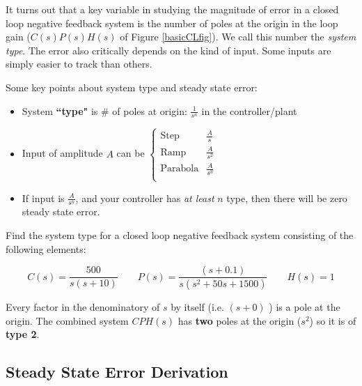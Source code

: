 It turns out that a key variable in studying the magnitude of error in a closed loop negative feedback system 
is the number of poles at the origin in the loop gain ($C(s)P(s)H(s)$ of Figure \ref{basicCLfig}). We 
call this number the {\it system type}.  The error also critically depends on the kind of input.  Some 
inputs are simply easier to track than  others.

\noindent
Some key points about system type and steady state error:
 \begin{itemize}
 	\item System {\bf ``type"} is \# of poles at origin: $\frac{1}{s^n}$ in the controller/plant

 	\item Input of amplitude $A$ can be
 	$
 	\left \{
  	\begin{array}{lc}
 	\mathrm{Step}		&    \frac{A}{s}   \\
 	\mathrm{Ramp}		&    \frac{A}{s^2}  \\
 	\mathrm{Parabola}	&    \frac{A}{s^3}  \\
 	\end{array}
 	\right .
        $

 	\item  If input is $\frac{A}{s^n}$, and your controller has {\it at least} $n$ type,
 		then there will be zero steady state error.
 \end{itemize}


\begin{ExampleSmall}
Find the system type for a closed loop negative feedback system consisting of the following elements:


 \[
 C(s) = \frac{500}{s(s+10)} \qquad P(s) = \frac{(s+0.1)}{s(s^2+50s+1500)} \qquad H(s) = 1
 \]

 \vspace{0.25in}
Every factor in the denominatory of $s$ by itself (i.e. $(s+0)$ ) is a pole at the origin. 
The combined system $CPH(s)$ has {\bf two} poles at the origin ($s^2$) so it is of {\bf type 2}.
\end{ExampleSmall}








\subsection{Steady State Error Derivation}

